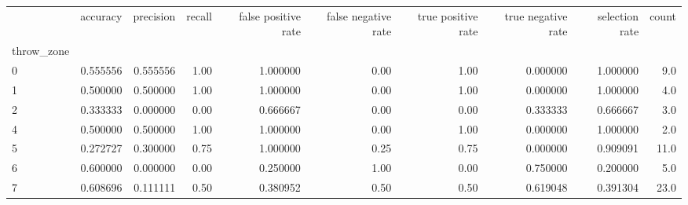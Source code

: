 \begin{tabular}{lrrrrrrrrr}
\toprule
{} &  accuracy &  precision &  recall &  false positive rate &  false negative rate &  true positive rate &  true negative rate &  selection rate &  count \\
throw\_zone &           &            &         &                      &                      &                     &                     &                 &        \\
\midrule
0          &  0.555556 &   0.555556 &    1.00 &             1.000000 &                 0.00 &                1.00 &            0.000000 &        1.000000 &    9.0 \\
1          &  0.500000 &   0.500000 &    1.00 &             1.000000 &                 0.00 &                1.00 &            0.000000 &        1.000000 &    4.0 \\
2          &  0.333333 &   0.000000 &    0.00 &             0.666667 &                 0.00 &                0.00 &            0.333333 &        0.666667 &    3.0 \\
4          &  0.500000 &   0.500000 &    1.00 &             1.000000 &                 0.00 &                1.00 &            0.000000 &        1.000000 &    2.0 \\
5          &  0.272727 &   0.300000 &    0.75 &             1.000000 &                 0.25 &                0.75 &            0.000000 &        0.909091 &   11.0 \\
6          &  0.600000 &   0.000000 &    0.00 &             0.250000 &                 1.00 &                0.00 &            0.750000 &        0.200000 &    5.0 \\
7          &  0.608696 &   0.111111 &    0.50 &             0.380952 &                 0.50 &                0.50 &            0.619048 &        0.391304 &   23.0 \\
\bottomrule
\end{tabular}
